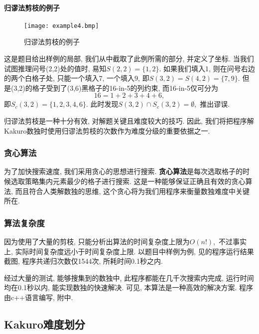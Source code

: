             \paragraph{归谬法剪枝的例子}
                \begin{figure}[htb]
                    \centering
                    \texttt{[image: example4.bmp]}
                    \caption[例4]{归谬法剪枝的例子}\label{exm4}
                \end{figure}
                这是题目给出样例的局部, 我们从中截取了此例所需的部分, 并定义了坐标.
                当我们试图推理问号(2,2)处的值时, 易知$S(2,2)=\{1,2\}.$
                如果我们填入1, 则在问号右边的两个白格子处,
                只能一个填入7, 一个填入9, 即$S(3,2)=S(4,2)=\{7,9\}.$
                但是(3,2)的格子受到了(3,6)黑格子的16-in-5的列约束, 而16-in-5仅可分为\[16=1+2+3+4+6,\]
                即$S_{c}(3,2)=\{1,2,3,4,6\}.$
                此时发现$S(3,2)\cap S_{c}(3,2)=\emptyset,$
                推出谬误.

            归谬法剪枝是一种十分有效, 对解题关键且难度较大的技巧.\label{xplCtd}
            因此, 我们将把程序解Kakuro数独时使用归谬法剪枝的次数作为难度分级的重要依据之一.

        \subsubsection{贪心算法}
            为了加快搜索速度, 我们采用贪心的思想进行搜索.
            \label{dfnGrd}\textbf{贪心算法}是每次选取格子的时候选取策略集内元素最少的格子进行搜索.
            这是一种能够保证正确且有效的贪心算法, 而且符合人类解数独的思维,
            这个贪心将为我们用程序来衡量数独难度中关键所在.

        \subsubsection{算法复杂度}
            因为使用了大量的剪枝, 只能分析出算法的时间复杂度上限为$O(n!),$
            不过事实上, 实际时间复杂度远小于时间复杂度上限.
            以题目中样例为例, 见的程序运行结果截图,
            程序共递归次数仅1544次, 所耗时间0.1秒之内.

            经过大量的测试, 能够搜集到的数独中, 此程序都能在几千次搜索内完成,
            运行时间均在0.1秒以内, 能实现数独的快速解决.
            可见, 本算法是一种高效的解决方案.
            程序由c++语言编写, 附中.

    \subsection{Kakuro难度划分}
